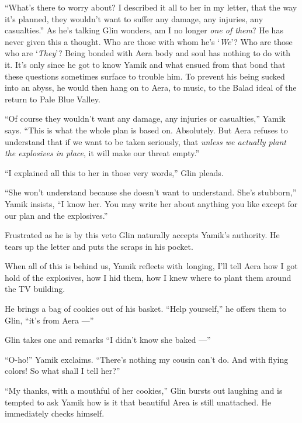 \documentclass[twoside,11pt,openany]{book}
\begin{document}
``What's there to worry about? I described it all to her in my letter, that the way it's planned,
they   wouldn't want to suffer any damage, any injuries, any casualties.'' As he's talking Glin
wonders, am I no longer \textit{one of them}? He has never given this a
thought. Who are those with whom he's `\textit{We}{}'? Who are those who are `\textit{They}'? Being bonded with Aera
body and soul has nothing to do with it. It's only since he got to know Yamik and what ensued from that
bond that these questions sometimes surface to trouble him. To prevent his being sucked into an abyss, he
would then hang on to Aera, to music, to the Balad ideal of the return to Pale Blue Valley.

``Of course they wouldn't want any damage, any injuries or casualties,'' Yamik says.
``This is what the whole plan is based on. Absolutely. But Aera refuses to understand that if we want to
be taken seriously, that \textit{unless we actually plant the explosives in place}, it
will make our threat empty.''

``I explained all this to her in those very words,'' Glin pleads.

``She won't understand because she doesn't want to understand. She's stubborn,'' Yamik insists, ``I know
her. You may write her about anything you like except for our plan and the explosives.''

Frustrated as he is by this veto Glin naturally accepts Yamik's authority. He tears up the letter and puts the scraps in
his pocket.

When all of this is behind us, Yamik reflects with~longing, I'll tell Aera how I got hold of the explosives, how I hid
them, how I knew where to plant them around the TV building.

He brings a bag of cookies out of his basket. ``Help yourself,'' he offers them to Glin,
``it's from Aera ---''

Glin takes one and remarks ``I didn't know she baked ---''

``O-ho!'' Yamik exclaims. ``There's nothing my cousin can't do. And with flying
colors! So what shall I tell her?''

``My thanks, with a mouthful of her cookies,'' Glin bursts out
laughing and is tempted to ask
Yamik how is it that beautiful Area is still unattached. He immediately checks himself.



\chapter{}
\end{document}
